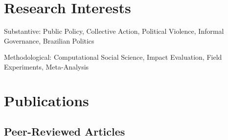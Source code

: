 \documentclass[a4paper]{article}
\renewenvironment{itemize}{
	\begin{list}{}{
			\setlength{\leftmargin}{1.5em}
		}
		}{
	\end{list}
}
\begin{document}
	\section*{Research Interests}

	\begin{itemize}
		\item Substantive: Public Policy, Collective Action, Political Violence, Informal Governance, Brazilian Politics
		\item Methodological: Computational Social Science, Impact Evaluation, Field Experiments, Meta-Analysis
	\end{itemize}

	\section*{Publications}

	\subsection*{Peer-Reviewed Articles}
\end{document}
